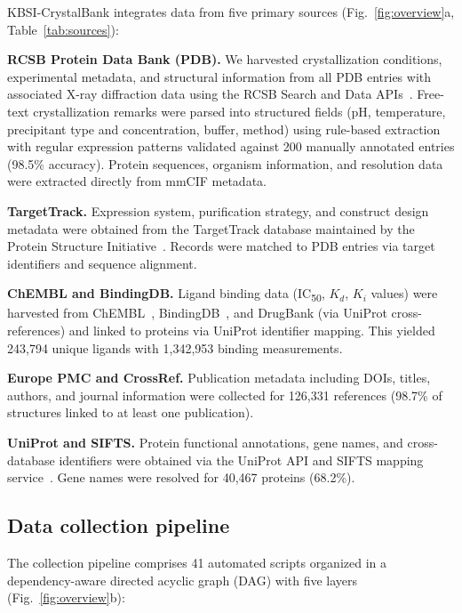 \documentclass[11pt]{article}
\begin{document}
KBSI-CrystalBank integrates data from five primary sources (Fig.~\ref{fig:overview}a, Table~\ref{tab:sources}):

\textbf{RCSB Protein Data Bank (PDB).} We harvested crystallization conditions, experimental metadata, and structural information from all PDB entries with associated X-ray diffraction data using the RCSB Search and Data APIs~\cite{berman2000}. Free-text crystallization remarks were parsed into structured fields (pH, temperature, precipitant type and concentration, buffer, method) using rule-based extraction with regular expression patterns validated against 200 manually annotated entries (98.5\% accuracy). Protein sequences, organism information, and resolution data were extracted directly from mmCIF metadata.

\textbf{TargetTrack.} Expression system, purification strategy, and construct design metadata were obtained from the TargetTrack database maintained by the Protein Structure Initiative~\cite{berman2009psi}. Records were matched to PDB entries via target identifiers and sequence alignment.

\textbf{ChEMBL and BindingDB.} Ligand binding data (IC\textsubscript{50}, $K_d$, $K_i$ values) were harvested from ChEMBL~\cite{zdrazil2024}, BindingDB~\cite{gilson2016}, and DrugBank (via UniProt cross-references) and linked to proteins via UniProt identifier mapping. This yielded 243,794 unique ligands with 1,342,953 binding measurements.

\textbf{Europe PMC and CrossRef.} Publication metadata including DOIs, titles, authors, and journal information were collected for 126,331 references (98.7\% of structures linked to at least one publication).

\textbf{UniProt and SIFTS.} Protein functional annotations, gene names, and cross-database identifiers were obtained via the UniProt API and SIFTS mapping service~\cite{dana2019}. Gene names were resolved for 40,467 proteins (68.2\%).

\subsection*{Data collection pipeline}

The collection pipeline comprises 41 automated scripts organized in a dependency-aware directed acyclic graph (DAG) with five layers (Fig.~\ref{fig:overview}b):
\end{document}
